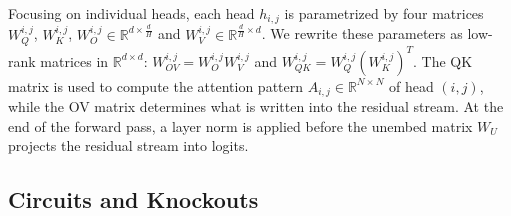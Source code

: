 Focusing on individual heads, each head $h_{i,j}$ is parametrized by four matrices $W_Q^{i,j}$, $W_K^{i,j}$, $W_O^{i,j} \in \mathbb{R}^{d \times \frac{d}{H}}$ and $W_V^{i,j} \in \mathbb{R}^{\frac{d}{H} \times d}$. 
We rewrite these parameters as low-rank matrices in $\mathbb{R}^{d \times d}$: $W_{OV}^{i,j} = W_O^{i,j} W_V^{i,j}$ and $W_{QK}^{i,j} = W_Q^{i,j} (W_K^{i,j})^T$. The QK matrix is used to compute the attention pattern $A_{i, j} \in \mathbb{R}^{N\times N}$ of head $(i, j)$, while the OV matrix determines what is written into the residual stream. At the end of the forward pass, a layer norm is applied before the unembed matrix $W_U$ projects the residual stream into logits.




\subsection{Circuits and Knockouts}
\label{sec:circuits}
\label{sec:knockouts}


